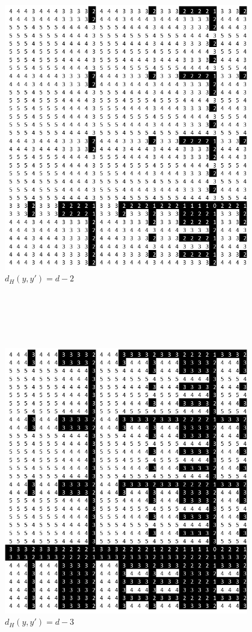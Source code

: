 \documentclass[oneside,12pt]{DISCSthesis}
\begin{document}
\begin{figure}[h]
			\begin{minipage}{.33\textwidth}\centering\includegraphics[width=0.95\textwidth]{img/2}\\ $d_H(y,y') = d-2$ \end{minipage}
			\\\ \\\ \\\ \\
			\begin{minipage}{.33\textwidth}\centering\includegraphics[width=0.95\textwidth]{img/3}\\ $d_H(y,y') = d-3$ \end{minipage}

\end{figure}
\end{document}
